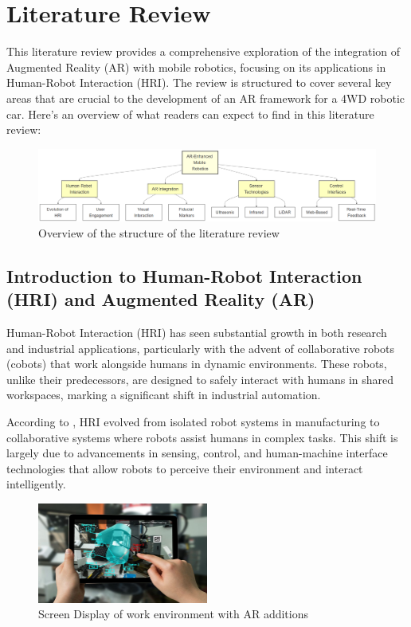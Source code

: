 \chapter{\label{ch:lit_review} Literature Review}

This literature review provides a comprehensive exploration of the integration of Augmented Reality (AR) with mobile robotics, focusing on its applications in Human-Robot Interaction (HRI). The review is structured to cover several key areas that are crucial to the development of an AR framework for a 4WD robotic car. Here's an overview of what readers can expect to find in this literature review:

\begin{figure}[ht]
    \centering
    \includegraphics[width=1\textwidth]{ch2/figs/lit_overview.png}
    \caption{Overview of the structure of the literature review}
    \label{fig:Lit_overview}
\end{figure}

\section{Introduction to Human-Robot Interaction (HRI) and Augmented Reality (AR)}

Human-Robot Interaction (HRI) has seen substantial growth in both research and industrial applications, particularly with the advent of collaborative robots (cobots) that work alongside humans in dynamic environments. These robots, unlike their predecessors, are designed to safely interact with humans in shared workspaces, marking a significant shift in industrial automation. 

According to \cite{Hentout2019}, HRI evolved from isolated robot systems in manufacturing to collaborative systems where robots assist humans in complex tasks. This shift is largely due to advancements in sensing, control, and human-machine interface technologies that allow robots to perceive their environment and interact intelligently.

\begin{figure}[ht]
    \centering
    \includegraphics[width=0.5\textwidth]{ch2/figs/image_overlay.png}
    \caption{Screen Display of work environment with AR additions}
    \label{fig:AR_work_overlay}
\end{figure}

